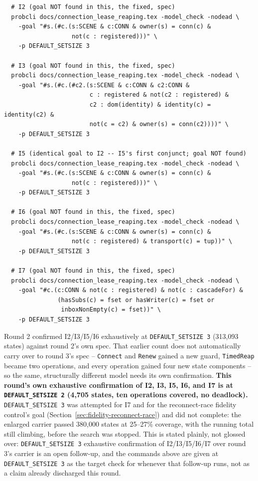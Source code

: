 \documentclass[a4paper,10pt,fleqn]{article}
\begin{document}
\begin{verbatim}
  # I2 (goal NOT found in this, the fixed, spec)
  probcli docs/connection_lease_reaping.tex -model_check -nodead \
    -goal "#s.(#c.(s:SCENE & c:CONN & owner(s) = conn(c) &
                   not(c : registered)))" \
    -p DEFAULT_SETSIZE 3

  # I3 (goal NOT found in this, the fixed, spec)
  probcli docs/connection_lease_reaping.tex -model_check -nodead \
    -goal "#s.(#c.(#c2.(s:SCENE & c:CONN & c2:CONN &
                        c : registered & not(c2 : registered) &
                        c2 : dom(identity) & identity(c) = identity(c2) &
                        not(c = c2) & owner(s) = conn(c2))))" \
    -p DEFAULT_SETSIZE 3

  # I5 (identical goal to I2 -- I5's first conjunct; goal NOT found)
  probcli docs/connection_lease_reaping.tex -model_check -nodead \
    -goal "#s.(#c.(s:SCENE & c:CONN & owner(s) = conn(c) &
                   not(c : registered)))" \
    -p DEFAULT_SETSIZE 3

  # I6 (goal NOT found in this, the fixed, spec)
  probcli docs/connection_lease_reaping.tex -model_check -nodead \
    -goal "#s.(#c.(s:SCENE & c:CONN & owner(s) = conn(c) &
                   not(c : registered) & transport(c) = tup))" \
    -p DEFAULT_SETSIZE 3

  # I7 (goal NOT found in this, the fixed, spec)
  probcli docs/connection_lease_reaping.tex -model_check -nodead \
    -goal "#c.(c:CONN & not(c : registered) & not(c : cascadeFor) &
               (hasSubs(c) = fset or hasWriter(c) = fset or
                inboxNonEmpty(c) = fset))" \
    -p DEFAULT_SETSIZE 3
\end{verbatim}

Round 2 confirmed I2/I3/I5/I6 exhaustively at \texttt{DEFAULT\_SETSIZE 3}
(313{,}093 states) against round 2's own spec. That earlier count does not
automatically carry over to round 3's spec -- \texttt{Connect} and
\texttt{Renew} gained a new guard, \texttt{TimedReap} became two
operations, and every operation gained four new state components -- so the
same, structurally different model needs its own confirmation.
\textbf{This round's own exhaustive confirmation of I2, I3, I5, I6, and I7
is at \texttt{DEFAULT\_SETSIZE 2} (4{,}705 states, ten operations
covered, no deadlock).} \texttt{DEFAULT\_SETSIZE 3} was attempted for I7
and for the reconnect-race fidelity control's goal
(Section~\ref{sec:fidelity-reconnect-race}) and did not complete: the
enlarged carrier passed 380{,}000 states at 25--27\% coverage, with the
running total still climbing, before the search was stopped. This is
stated plainly, not glossed over: \texttt{DEFAULT\_SETSIZE 3} exhaustive
confirmation of I2/I3/I5/I6/I7 over round 3's carrier is an open
follow-up, and the commands above are given at \texttt{DEFAULT\_SETSIZE
3} as the target check for whenever that follow-up runs, not as a claim
already discharged this round.
\end{document}
